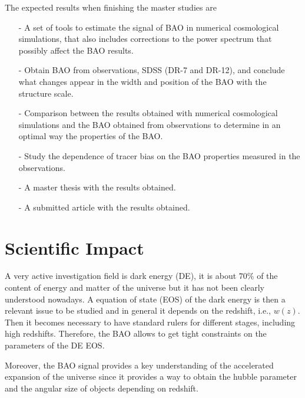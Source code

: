 \documentclass[a4,useAMS,usegraphicx,12pt]{article}
\begin{document}
The expected results when finishing the master studies are 

\begin{itemize}

\item[-] A set of tools to estimate the signal of BAO in numerical cosmological simulations, that also includes 
corrections to the power spectrum that possibly affect the BAO results. 

\item[-] Obtain BAO from observations, SDSS (DR-7 and DR-12), and conclude what changes appear 
in the width and position of the BAO with the structure scale. 

\item[-] Comparison between the results obtained with numerical cosmological simulations
and the BAO obtained from observations to determine in an optimal way the properties of the BAO.  

\item[-] Study the dependence of tracer bias on the BAO properties measured in the observations. 

\item[-] A master thesis with the results obtained. 

\item[-] A submitted article with the results obtained.  

\end{itemize}

\section{Scientific Impact}


A very active investigation field is dark energy (DE), it is about $70\%$ of the content of energy and
matter of the universe but it has not been clearly understood nowadays. A equation of state (EOS) of the dark
energy is then a relevant issue to be studied and in general it depends on the redshift, i.e., $w(z)$. Then
it becomes necessary to have standard rulers for different stages, including high redshifts. Therefore, the 
BAO allows to get tight constraints on the parameters of the DE EOS. 

Moreover, the BAO signal provides a key understanding of the accelerated expansion of the universe since
it provides a way to obtain the hubble parameter and the angular size of objects depending on redshift.  
\end{document}
